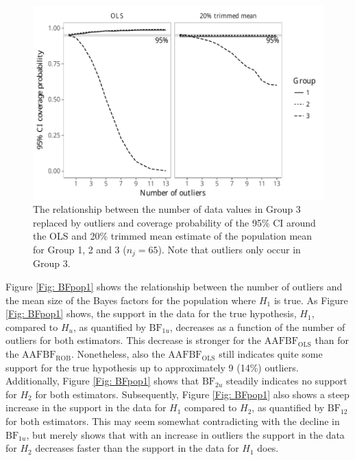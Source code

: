 \documentclass[11pt, a4paper]{article}
\begin{document}
\begin{figure}[t]
\begin{center}

	\begin{minipage}{.5\textheight}
	\includegraphics[scale=0.75]{partI_covplot_pop1.pdf}
	\caption{The relationship between the number of data values in Group 3
	replaced by outliers and coverage probability of the 95\% CI around the OLS
	and 20\% trimmed mean estimate of the population mean for Group 1, 2 and 3
	($n_j = 65$). Note that outliers only occur in Group 3.}
	\label{Fig: covplot}
	\end{minipage}
	
\end{center}
\end{figure}

Figure \ref{Fig: BFpop1} shows the relationship between the number of outliers and the mean size of the Bayes factors for the population where $H_1$ is true.
As Figure \ref{Fig: BFpop1} shows, the support in the data for the true hypothesis, $H_1$, compared to $H_u$, as quantified by $\mathrm{BF}_{1u}$, decreases as a function of the number of outliers for both estimators. 
This decrease is stronger for the $\mathrm{AAFBF_{OLS}}$ than for the $\mathrm{AAFBF_{ROB}}$. 
Nonetheless, also the $\mathrm{AAFBF_{OLS}}$ still indicates quite some support for the true hypothesis up to approximately 9 (14\%) outliers.
Additionally, Figure \ref{Fig: BFpop1} shows that $\mathrm{BF}_{2u}$ steadily indicates no support for $H_2$ for both estimators. 
Subsequently, Figure \ref{Fig: BFpop1} also shows a steep increase in the support in the data for $H_1$ compared to $H_2$, as quantified by $\mathrm{BF}_{12}$ for both estimators. 
This may seem somewhat contradicting with the decline in $\mathrm{BF}_{1u}$, but merely shows that with an increase in outliers the support in the data for $H_2$ decreases faster than the support in the data for $H_1$ does. 
\end{document}
